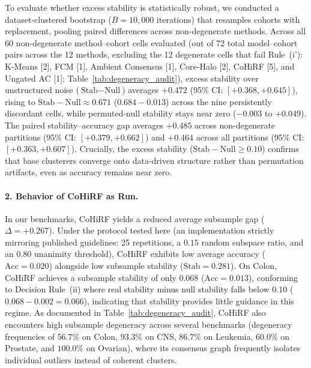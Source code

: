 \documentclass[pdflatex,sn-mathphys-num]{sn-jnl}
\theoremstyle{thmstyleone}
\theoremstyle{thmstyletwo}
\theoremstyle{thmstylethree}
\begin{document}
To evaluate whether excess stability is statistically robust, we conducted a dataset-clustered bootstrap ($B=10{,}000$ iterations) that resamples cohorts with replacement, pooling paired differences across non-degenerate methods. Across all 60 non-degenerate method--cohort cells evaluated (out of 72 total model--cohort pairs across the 12 methods, excluding the 12 degenerate cells that fail Rule~(i'): K-Means [2], FCM [1], Ambient Consensus [1], Core-Halo [2], CoHiRF [5], and Ungated AC [1]; Table~\ref{tab:degeneracy_audit}), excess stability over unstructured noise ($\text{Stab} - \text{Null}$) averages $+0.472$ (95\% CI: $[+0.368, +0.645]$), rising to $\text{Stab} - \text{Null} \approx 0.671$ ($0.684 - 0.013$) across the nine persistently discordant cells, while permuted-null stability stays near zero ($-0.003$ to $+0.049$). The paired stability--accuracy gap averages $+0.485$ across non-degenerate partitions (95\% CI: $[+0.379, +0.662]$) and $+0.464$ across all partitions (95\% CI: $[+0.363, +0.607]$). Crucially, the excess stability ($\text{Stab} - \text{Null} \ge 0.10$) confirms that base clusterers converge onto data-driven structure rather than permutation artifacts, even as accuracy remains near zero.

\paragraph{2. Behavior of CoHiRF as Run.}
In our benchmarks, CoHiRF yields a reduced average subsample gap ($\Delta = +0.267$). Under the protocol tested here (an implementation strictly mirroring published guidelines: 25 repetitions, a $0.15$ random subspace ratio, and an $0.80$ unanimity threshold), CoHiRF exhibits low average accuracy ($\text{Acc} = 0.020$) alongside low subsample stability ($\text{Stab} = 0.281$). On Colon, CoHiRF achieves a subsample stability of only $0.068$ ($\text{Acc}=0.013$), conforming to Decision Rule~(ii) where real stability minus null stability falls below $0.10$ ($0.068 - 0.002 = 0.066$), indicating that stability provides little guidance in this regime. As documented in Table~\ref{tab:degeneracy_audit}, CoHiRF also encounters high subsample degeneracy across several benchmarks (degeneracy frequencies of $56.7\%$ on Colon, $93.3\%$ on CNS, $86.7\%$ on Leukemia, $60.0\%$ on Prostate, and $100.0\%$ on Ovarian), where its consensus graph frequently isolates individual outliers instead of coherent clusters.
\end{document}
